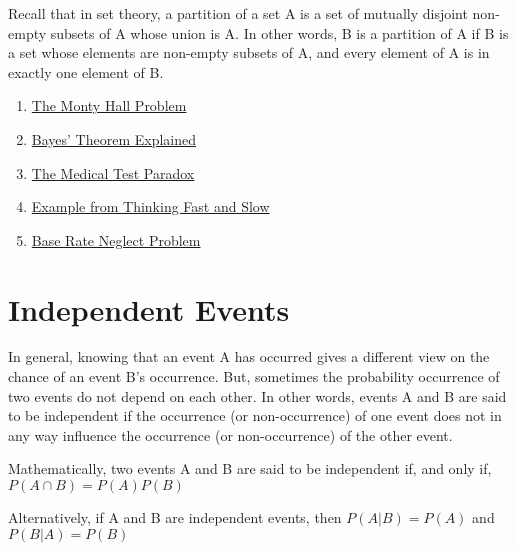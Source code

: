 \begin{note}\end{note}
Recall that in set theory, a partition of a set A is a set of mutually disjoint non-empty subsets of A whose union is A. In other words, B is a partition of A if B is a set whose elements are non-empty subsets of A, and every element of A is in exactly one element of B.



\begin{note}\end{note}
\begin{enumerate}
    \item \href{https://www.youtube.com/watch?v=4Lb-6rxZxx0}{The Monty Hall Problem}
    \item \href{https://www.youtube.com/watch?v=HZGCoVF3YvM}{Bayes' Theorem Explained}
    \item \href{https://www.youtube.com/watch?v=lG4VkPoG3ko}{The Medical Test Paradox}
    \item \href{https://www.anesi.com/bayes.htm}{Example from Thinking Fast and Slow}
    \item \href{https://www.youtube.com/watch?v=1csFTDXXULY}{Base Rate Neglect Problem}
\end{enumerate}


\section{Independent Events}
In general, knowing that an event A has occurred gives a different view on the chance of an event B's occurrence. But, sometimes the probability occurrence of two events do not depend on each other. In other words, events A and B are said to be independent if the occurrence (or non-occurrence) of one event does not in any way influence the occurrence (or non-occurrence) of the other event.

\begin{definition}
Mathematically, two events A and B are said to be independent if, and only if, $P(A \cap B) = P(A) P(B)$
\end{definition}
Alternatively, if A and B are independent events, then $P(A|B) = P(A)$ and $P(B|A) = P(B)$

